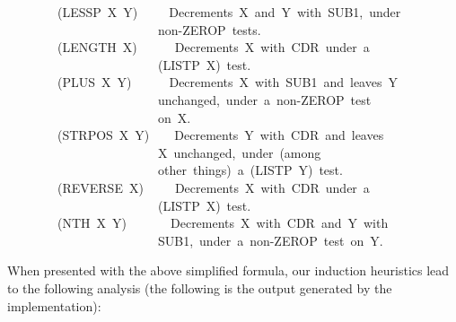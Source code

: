 \documentclass[11pt]{book}
\newenvironment{pubasis}{\begin{flushleft}\ttfamily\small}{\normalsize\rmfamily\end{flushleft}}
\begin{document}
\begin{pubasis}
~~~~~~~~(LESSP~X~Y)~~~~~Decrements~X~and~Y~with~SUB1,~under\\
~~~~~~~~~~~~~~~~~~~~~~~~non-ZEROP~tests.\\

~~~~~~~~(LENGTH~X)~~~~~~Decrements~X~with~CDR~under~a\\
~~~~~~~~~~~~~~~~~~~~~~~~(LISTP~X)~test.\\

~~~~~~~~(PLUS~X~Y)~~~~~~Decrements~X~with~SUB1~and~leaves~Y\\
~~~~~~~~~~~~~~~~~~~~~~~~unchanged,~under~a~non-ZEROP~test\\
~~~~~~~~~~~~~~~~~~~~~~~~on~X.\\

~~~~~~~~(STRPOS~X~Y)~~~~Decrements~Y~with~CDR~and~leaves\\
~~~~~~~~~~~~~~~~~~~~~~~~X~unchanged,~under~(among\\
~~~~~~~~~~~~~~~~~~~~~~~~other~things)~a~(LISTP~Y)~test.\\

~~~~~~~~(REVERSE~X)~~~~~Decrements~X~with~CDR~under~a\\
~~~~~~~~~~~~~~~~~~~~~~~~(LISTP~X)~test.\\

~~~~~~~~(NTH~X~Y)~~~~~~~Decrements~X~with~CDR~and~Y~with\\
~~~~~~~~~~~~~~~~~~~~~~~~SUB1,~under~a~non-ZEROP~test~on~Y.\\
\end{pubasis}
When presented with the above simplified formula, our induction
heuristics lead to the following analysis (the following is
the output generated by the implementation):
\end{document}

